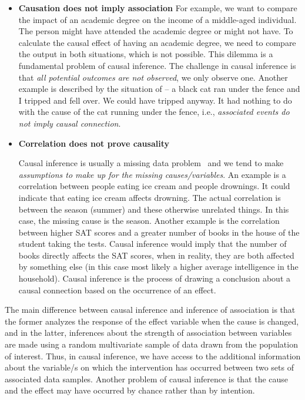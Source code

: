 \documentclass[%
 aps,
 jmp,%
 amsmath,amssymb,
 reprint,%
]{revtex4-2}
\begin{document}
\begin{itemize}[noitemsep,nolistsep]
\item \textbf{Causation does not imply association}
	For example, we want to compare the impact of an academic degree on the income of a middle-aged individual. 
	The person might have attended the academic degree or might not have. 
	To calculate the causal effect of having an academic degree, we need to compare the output in both situations, which is not possible. 
	This dilemma is a fundamental problem of causal inference. 
	The challenge in causal inference is that \textit{all potential outcomes are not observed}, we only observe one.
	Another example is described by the situation of -- a black cat ran under the fence and I tripped and fell over. 
	We could have tripped anyway. 
	It had nothing to do with the cause of the cat running under the fence, i.e., \textit{associated events do not imply causal connection}.
	
    \item \textbf{Correlation does not prove causality}
	
	Causal inference is usually a missing data problem~\cite{guo2020survey} and we tend to make \textit{assumptions to make up for the missing causes/variables}. 
	An example is a correlation between people eating ice cream and people drownings. 
	It could indicate that eating ice cream affects drowning. 
	The actual correlation is between the season (summer) and these otherwise unrelated things. 
	In this case, the missing cause is the season. 
	Another example is the correlation between higher SAT scores and a greater number of books in the house of the student taking the tests. 
	Causal inference would imply that the number of books directly affects the SAT scores, when in reality, they are both affected by something else (in this case most likely a higher average intelligence in the household). 
	Causal inference is the process of drawing a conclusion about a causal connection based on the occurrence of an effect.
\end{itemize}
The main difference between causal inference and inference of association is that the former analyzes the response of the effect variable when the cause is changed, and in the latter, inferences about the strength of association between variables are made using a random multivariate sample of data drawn from the population of interest.
Thus, in causal inference, we have access to the additional information about the variable/s on which the intervention has occurred between two sets of associated data samples.
Another problem of causal inference is that the cause and the effect may have occurred by chance rather than by intention.
\end{document}
